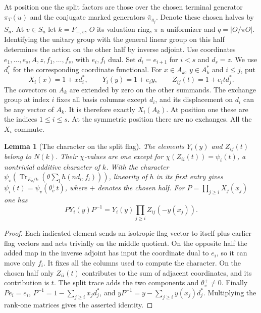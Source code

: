 \documentclass[a4paper,11pt]{article}
\newtheorem{lemma}[proposition]{Lemma}
\theoremstyle{definition}
\theoremstyle{remark}
\numberwithin{equation}{section}
\begin{document}
At position one the split factors are those over the chosen
terminal generator \(\pi_T(u)\) and the conjugate marked generators
\(\bar\pi_{g_j}\). Denote these chosen halves by \(S_u\).
At \(v\in S_u\) let \(k=F_{+,v}\), \(O\) its valuation ring,
\(\pi\) a uniformizer and \(q=|O/\pi O|\). Identifying the unitary
group with the general linear group on this half determines the
action on the other half by inverse adjoint. Use coordinates
\(e_1,\ldots,e_s,A,z,f_1,\ldots,f_s\), with \(e_i,f_i\) dual. Set
\(d_i=e_{i+1}\) for \(i<s\) and \(d_s=z\). We use \(d_i^*\) for
the corresponding coordinate functional. For \(x\in A_k\),
\(y\in A_k^*\) and \(i\le j\), put
\[
 X_i(x)=1+x d_i^*,\qquad Y_i(y)=1+e_i y,\qquad
 Z_{ij}(t)=1+e_i t d_j^* .
\]
The covectors on \(A_k\) are extended by zero on the other summands.
The exchange group at index \(i\) fixes all basis columns except
\(d_i\), and its displacement on \(d_i\) can be any vector of
\(A_k\). It is therefore exactly \(X_i(A_k)\). At position one
these are the indices \(1\le i\le s\). At the symmetric position
there are no exchanges. All the \(X_i\) commute.

\begin{lemma}[The character on the split flag]\label{lem:exchangeroot336}
The elements \(Y_i(y)\) and \(Z_{ij}(t)\) belong to \(N(k)\).
Their \(\chi\)-values are one except for
\(\chi(Z_{ii}(t))=\psi_i(t)\), a nontrivial additive character of
\(k\). With the character
\(\psi_v(\operatorname{Tr}_{E_v/k}(\theta\sum_l
 h(n d_l,f_l)))\), linearity of \(h\) in its first entry gives
\(\psi_i(t)=\psi_v(\theta_v^+t)\), where \(+\) denotes the chosen
half. For \(P=\prod_{j\ge i}X_j(x_j)\) one has
\[
 P Y_i(y)P^{-1}=Y_i(y)\prod_{j\ge i} Z_{ij}(-y(x_j)).
\]
\end{lemma}
\begin{proof}
Each indicated element sends an isotropic flag vector to itself
plus earlier flag vectors and acts trivially on the middle quotient.
On the opposite half the added map in the inverse adjoint has
input the coordinate dual to \(e_i\), so it can move only
\(f_i\). It fixes all the columns used to compute the character.
On the chosen half only \(Z_{ii}(t)\) contributes to the
sum of adjacent coordinates, and its contribution is \(t\). The
split trace adds the two components and \(\theta_v^+\ne0\).
Finally \(P e_i=e_i\), \(P^{-1}=1-\sum_{j\ge i}x_jd_j^*\), and
\(yP^{-1}=y-\sum_{j\ge i}y(x_j)d_j^*\). Multiplying the
rank-one matrices gives the asserted identity.
\end{proof}
\end{document}
